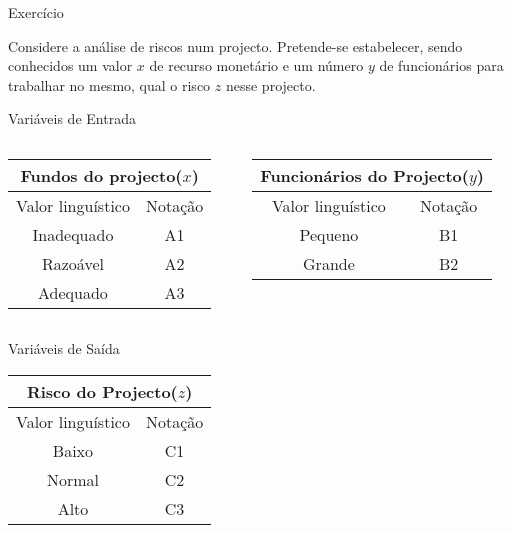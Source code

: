 \documentclass[portuges]{beamer}
\begin{document}
\begin{frame}{Exercício}
\begin{example}
	Considere a análise de riscos num projecto. 
	Pretende-se estabelecer, sendo conhecidos um valor $x$ de recurso 
	monetário e um número $y$ de funcionários para trabalhar no mesmo,
	qual o risco $z$ nesse projecto.
\end{example}
\end{frame}

\begin{frame}{Variáveis de Entrada}
	\begin{columns}
	\begin{column}{5cm}
	\begin{tabular}{c|c} 
		\hline
		\multicolumn{2}{c}{{\textbf{Fundos do projecto($x$)}}}\\ 
		\hline
		Valor linguístico & Notação \\ \hline
		Inadequado & A1 \\
		Razoável & A2 \\ 
		Adequado & A3 \\ \hline
	\end{tabular}
	\end{column}
	\begin{column}{5cm}
	\begin{tabular}{c|c} 
		\hline
		\multicolumn{2}{c}{{\textbf{Funcionários do Projecto($y$)}}}\\ 
		\hline
		Valor linguístico & Notação \\ \hline
		Pequeno & B1 \\ 
		Grande & B2 \\ \hline
	\end{tabular}
	\end{column}
	\end{columns}
\end{frame}

\begin{frame}{Variáveis de Saída}
\begin{tabular}{c|c} 
		\hline
		\multicolumn{2}{c}{{\textbf{Risco do Projecto($z$)}}}\\ 
		\hline
		Valor linguístico & Notação \\ \hline
		Baixo & C1 \\
		Normal & C2 \\ 
		Alto & C3 \\ \hline
	\end{tabular}
\end{frame}
\end{document}
